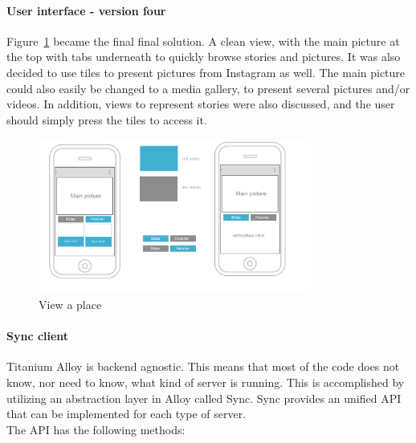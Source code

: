 \documentclass[11pt]{book}
\begin{document}
\paragraph{User interface - version four}
Figure~\ref{fig:phases_sprint2_uiVersionFourViewWall} became the final final solution. A clean view, with the main picture at the top with tabs underneath to quickly browse stories and pictures. It was also decided to use tiles to present pictures from Instagram as well. The main picture could also easily be changed to a media gallery, to present several pictures and/or videos. In addition, views to represent stories were also discussed, and the user should simply press the tiles to access it.

\begin{figure}[H]
    \centering
    \includegraphics[width=0.8\textwidth]{Figures/Phases/Sprint2/wallView.png}
    \caption{View a place}
    \label{fig:phases_sprint2_uiVersionFourViewWall}
\end{figure}

\paragraph{Sync client}
Titanium Alloy is backend agnostic. This means that most of the code does not know, nor need to know, what kind of server is running. This is accomplished by utilizing an abstraction layer in Alloy called Sync. Sync provides an unified API that can be implemented for each type of server.\\
The API has the following methods:
\end{document}
